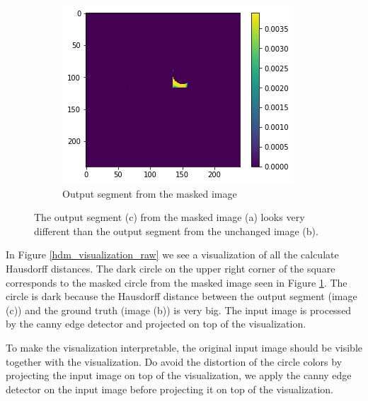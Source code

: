 \begin{figure}[H]
        \begin{subfigure}{.33\textwidth}
        \centering
        \includegraphics[width=\linewidth]{chapters/06_hdm/visualization/segment.png}
        \caption{Output segment from the masked image}
    \end{subfigure}
    \caption{The output segment (c) from the masked image (a) looks very different than the output segment from the unchanged image (b).}
    \label{hdm_visualization_sample}
\end{figure}

In Figure \ref{hdm_visualization_raw} we see a visualization of all the calculate Hausdorff distances. The dark circle on the upper right corner of the square corresponds to the masked circle from the masked image seen in Figure \ref{hdm_visualization_sample}. The circle is dark because the Hausdorff distance between the output segment (image (c)) and the ground truth (image (b)) is very big. The input image is processed by the canny edge detector and projected on top of the visualization.

To make the visualization interpretable, the original input image should be visible together with the visualization. Do avoid the distortion of the circle colors by projecting
the input image on top of the visualization, we apply the canny edge detector \cite{canny1987computational} on the input image before projecting it on top of the visualization.

